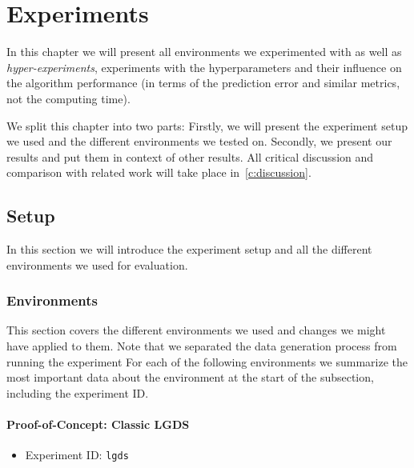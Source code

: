 \chapter{Experiments}
\label{c:experiments}



In this chapter we will present all environments we experimented with as well as \emph{hyper-experiments}, \ie experiments with the hyperparameters and their influence on the algorithm performance (in terms of the prediction error and similar metrics, not the computing time).

We split this chapter into two parts: Firstly, we will present the experiment setup we used and the different environments we tested on. Secondly, we present our results and put them in context of other results. All critical discussion and comparison with related work will take place in~\autoref{c:discussion}.

\section{Setup}
	In this section we will introduce the experiment setup and all the different environments we used for evaluation.

	\subsection{Environments}
		This section covers the different environments we used and changes we might have applied to them. Note that we separated the data generation process from running the experiment For each of the following environments we summarize the most important data about the environment at the start of the subsection, including the experiment ID.

		\subsubsection{Proof-of-Concept: Classic LGDS}
			\begin{itemize}
				\item Experiment ID: \texttt{lgds}
			\end{itemize}

